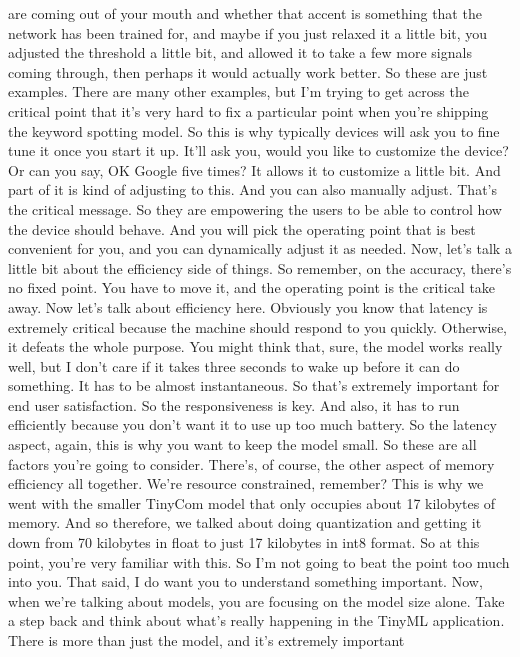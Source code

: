 are coming out of your mouth and whether that accent is something
that the network has been trained for, and maybe if you just
relaxed it a little bit, you adjusted the threshold a little bit,
and allowed it to take a few more signals coming through,
then perhaps it would actually work better.
So these are just examples.
There are many other examples, but I'm trying to get across the critical point
that it's very hard to fix a particular point
when you're shipping the keyword spotting model.
So this is why typically devices will ask you to fine tune it
once you start it up.
It'll ask you, would you like to customize the device?
Or can you say, OK Google five times?
It allows it to customize a little bit.
And part of it is kind of adjusting to this.
And you can also manually adjust.
That's the critical message.
So they are empowering the users to be able to control
how the device should behave.
And you will pick the operating point that is best convenient for you,
and you can dynamically adjust it as needed.
Now, let's talk a little bit about the efficiency side of things.
So remember, on the accuracy, there's no fixed point.
You have to move it, and the operating point is the critical take away.
Now let's talk about efficiency here.
Obviously you know that latency is extremely critical because the machine
should respond to you quickly.
Otherwise, it defeats the whole purpose.
You might think that, sure, the model works really well,
but I don't care if it takes three seconds
to wake up before it can do something.
It has to be almost instantaneous.
So that's extremely important for end user satisfaction.
So the responsiveness is key.
And also, it has to run efficiently because you don't
want it to use up too much battery.
So the latency aspect, again, this is why you want to keep the model small.
So these are all factors you're going to consider.
There's, of course, the other aspect of memory efficiency all together.
We're resource constrained, remember?
This is why we went with the smaller TinyCom model that only
occupies about 17 kilobytes of memory.
And so therefore, we talked about doing quantization and getting it down
from 70 kilobytes in float to just 17 kilobytes in int8 format.
So at this point, you're very familiar with this.
So I'm not going to beat the point too much into you.
That said, I do want you to understand something important.
Now, when we're talking about models, you are focusing on the model size
alone.
Take a step back and think about what's really
happening in the TinyML application.
There is more than just the model, and it's extremely important
